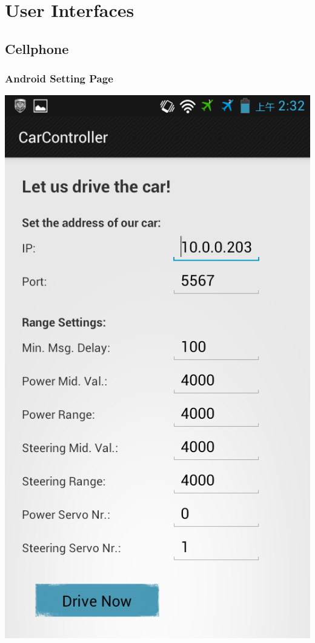\documentclass[pdf]{beamer}
\begin{document}
\section{User Interfaces}
\subsection{Cellphone}
\begin{frame}
\frametitle{Android Setting Page}
  \begin{center}
   \includegraphics[height = 0.8\textheight]{pics/android_settings.png}  
  \end{center}
\end{frame}
\end{document}
